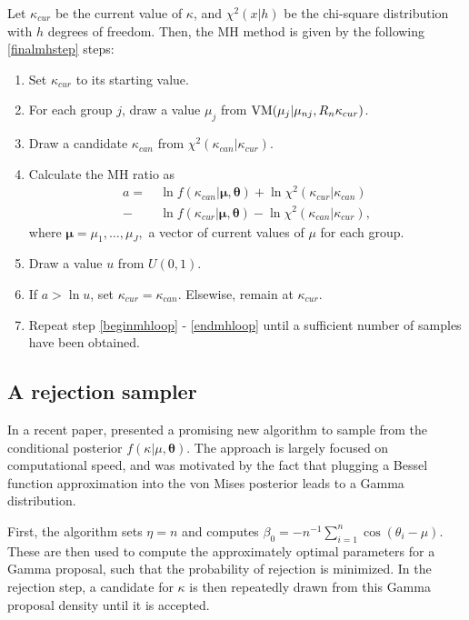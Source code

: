 \documentclass[]{gSCS2e}
\theoremstyle{plain}
\theoremstyle{definition}
\theoremstyle{remark}
\begin{document}
Let $\kappa_{cur}$ be the current value of $\kappa$, and $\chi^2(x \vert h)$ be the chi-square distribution with $h$ degrees of freedom. Then, the MH method is given by the following \ref{finalmhstep} steps:


\begin{enumerate}
\item Set $\kappa_{cur}$ to its starting value.
\item For each group $j$, draw a value $\mu_{j}$ from $\textnormal{VM}(\mu_{j} \vert \mu_{nj}, R_n\kappa_{cur})$. \label{beginmhloop}
\item Draw a candidate $\kappa_{can}$ from $\chi^2(\kappa_{can} \vert \kappa_{cur})$. 
\item Calculate the MH ratio as 
\begin{align*}
a = ~& \ln f(\kappa_{can} \vert \boldsymbol{\mu}, \boldsymbol\theta) + \ln  \chi^2(\kappa_{cur} \vert \kappa_{can}) \\
   - & \ln f(\kappa_{cur} \vert \boldsymbol{\mu}, \boldsymbol\theta) - \ln \chi^2(\kappa_{can} \vert \kappa_{cur}),
\end{align*}
where $\boldsymbol\mu = \mu_1, \dots, \mu_J,$ a vector of current values of $\mu$ for each group.
\item Draw a value $u$ from $U(0,1)$. 
\item If $a > \ln u $, set $\kappa_{cur} = \kappa_{can}$. Elsewise, remain at $\kappa_{cur}$. \label{endmhloop}
\item Repeat step \ref{beginmhloop} - \ref{endmhloop} until a sufficient number of samples have been obtained. \label{finalmhstep}
\end{enumerate}


\subsection{A rejection sampler \label{fm}}

In a recent paper, \citet{forbes2014fast} presented a promising new algorithm to sample from the conditional posterior $f(\kappa \vert \mu, \boldsymbol\theta)$. The approach is largely focused on computational speed, and was motivated by the fact that plugging a Bessel function approximation into the von Mises posterior leads to a Gamma distribution.

First, the algorithm sets $\eta = n$ and computes $\beta_0 = - n^{-1} \sum_{i=1}^{n} \cos(\theta_i - \mu)$. These are then used to compute the approximately optimal parameters for a Gamma proposal, such that the probability of rejection is minimized. In the rejection step, a candidate for $\kappa$ is then repeatedly drawn from this Gamma proposal density until it is accepted. 
\end{document}
